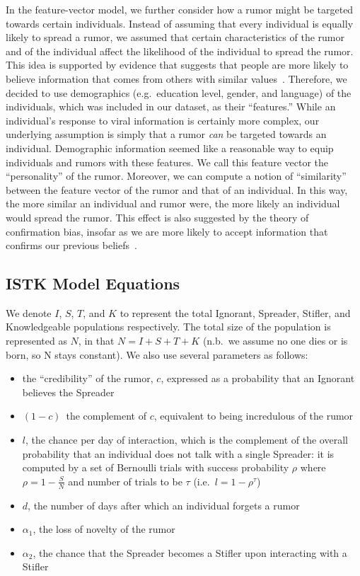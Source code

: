 In the feature-vector model, we further consider how a rumor might be targeted towards certain individuals.
Instead of assuming that every individual is equally likely to spread a rumor, we assumed that certain characteristics of the rumor and of the individual affect the likelihood of the individual to spread the rumor.
This idea is supported by evidence that suggests that people are more likely to believe information that comes from others with similar values~\cite{gillespie-2004}.
Therefore, we decided to use demographics (e.g.\ education level, gender, and language) of the individuals, which was included in our dataset, as their ``features.''
While an individual's response to viral information is certainly more complex, our underlying assumption is simply that a rumor \textit{can} be targeted towards an individual.
Demographic information seemed like a reasonable way to equip individuals and rumors with these features.
We call this feature vector the ``personality'' of the rumor.
Moreover, we can compute a notion of ``similarity'' between the feature vector of the rumor and that of an individual.
In this way, the more similar an individual and rumor were, the more likely an individual would spread the rumor.
This effect is also suggested by the theory of confirmation bias, insofar as we are more likely to accept information that confirms our previous beliefs~\cite{wason-1960}.

\subsection{ISTK Model Equations}
\label{subsec:istkeqns}

We denote $ I $, $ S $, $ T $, and $ K $ to represent the total Ignorant, Spreader, Stifler, and Knowledgeable populations respectively. The total size of the population is represented as $ N $, in that $ N = I + S + T + K $ (n.b.\ we assume no one dies or is born, so N stays constant). We also use several parameters as follows:
\begin{itemize}[nolistsep]
    \item the ``credibility'' of the rumor, $ c $, expressed as a probability that an Ignorant believes the Spreader
    \item $ (1 - c) $\, the complement of $ c $, equivalent to being incredulous of the rumor
    \item $ l $, the chance per day of interaction, which is the complement of the overall probability that an individual does not talk with a single Spreader: it is computed by a set of Bernoulli trials with success probability $ \rho $ where $ \rho = 1 - \frac{S}{N} $ and number of trials to be $ \tau $ (i.e.~$ l = 1 - \rho^\tau $)
    \item $ d $, the number of days after which an individual forgets a rumor
    \item $ \alpha_1 $, the loss of novelty of the rumor
    \item $ \alpha_2 $, the chance that the Spreader becomes a Stifler upon interacting with a Stifler
\end{itemize}

